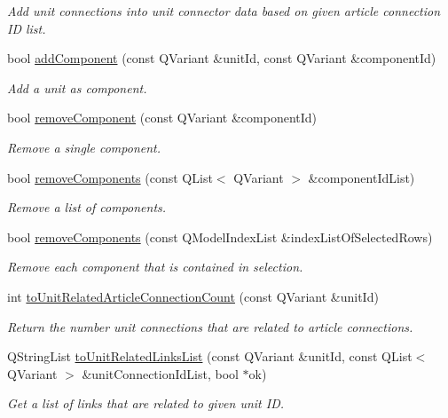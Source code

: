 \begin{DoxyCompactItemize}
\begin{DoxyCompactList}\small\item\em Add unit connections into unit connector data based on given article connection I\-D list. \end{DoxyCompactList}\item 
bool \hyperlink{classmdt_cl_unit_a2315532b648609910541e739a4217014}{add\-Component} (const Q\-Variant \&unit\-Id, const Q\-Variant \&component\-Id)
\begin{DoxyCompactList}\small\item\em Add a unit as component. \end{DoxyCompactList}\item 
bool \hyperlink{classmdt_cl_unit_aab0bc86d8ebbcd9ea1124c4e584a1fbf}{remove\-Component} (const Q\-Variant \&component\-Id)
\begin{DoxyCompactList}\small\item\em Remove a single component. \end{DoxyCompactList}\item 
bool \hyperlink{classmdt_cl_unit_a767070e07954eaf7247f26f777644f1c}{remove\-Components} (const Q\-List$<$ Q\-Variant $>$ \&component\-Id\-List)
\begin{DoxyCompactList}\small\item\em Remove a list of components. \end{DoxyCompactList}\item 
bool \hyperlink{classmdt_cl_unit_a0c8bd07382874bb2e2688f91c866892a}{remove\-Components} (const Q\-Model\-Index\-List \&index\-List\-Of\-Selected\-Rows)
\begin{DoxyCompactList}\small\item\em Remove each component that is contained in selection. \end{DoxyCompactList}\item 
int \hyperlink{classmdt_cl_unit_aaa3bba512c75d0358283e25723abf2f9}{to\-Unit\-Related\-Article\-Connection\-Count} (const Q\-Variant \&unit\-Id)
\begin{DoxyCompactList}\small\item\em Return the number unit connections that are related to article connections. \end{DoxyCompactList}\item 
Q\-String\-List \hyperlink{classmdt_cl_unit_a44ffa59c9588ca5afed64e8b1d94262c}{to\-Unit\-Related\-Links\-List} (const Q\-Variant \&unit\-Id, const Q\-List$<$ Q\-Variant $>$ \&unit\-Connection\-Id\-List, bool $\ast$ok)
\begin{DoxyCompactList}\small\item\em Get a list of links that are related to given unit I\-D. \end{DoxyCompactList}\item 

\end{DoxyCompactItemize}

